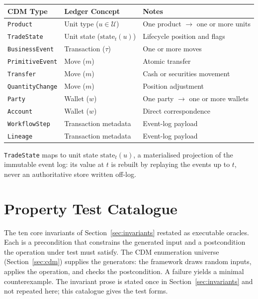 \documentclass[11pt,a4paper]{article}
\begin{document}
\begin{center}
\begin{tabular}{l l l}
\toprule
\textbf{CDM Type} & \textbf{Ledger Concept} & \textbf{Notes} \\
\midrule
\texttt{Product} & Unit type ($u \in \mathcal{U}$) & One product $\to$ one or more units \\
\texttt{TradeState} & Unit state ($\text{state}_t(u)$) & Lifecycle position and flags \\
\texttt{BusinessEvent} & Transaction ($\tau$) & One or more moves \\
\texttt{PrimitiveEvent} & Move ($m$) & Atomic transfer \\
\texttt{Transfer} & Move ($m$) & Cash or securities movement \\
\texttt{QuantityChange} & Move ($m$) & Position adjustment \\
\texttt{Party} & Wallet ($w$) & One party $\to$ one or more wallets \\
\texttt{Account} & Wallet ($w$) & Direct correspondence \\
\texttt{WorkflowStep} & Transaction metadata & Event-log payload \\
\texttt{Lineage} & Transaction metadata & Event-log payload \\
\bottomrule
\end{tabular}
\end{center}

\texttt{TradeState} maps to unit state $\text{state}_t(u)$, a materialised projection of the immutable event log: its value at $t$ is rebuilt by replaying the events up to $t$, never an authoritative store written off-log.

\section{Property Test Catalogue}
\label{app:properties}

The ten core invariants of Section~\ref{sec:invariants} restated as executable oracles. Each is a precondition that constrains the generated input and a postcondition the operation under test must satisfy. The CDM enumeration universe (Section~\ref{sec:cdm}) supplies the generators: the framework draws random inputs, applies the operation, and checks the postcondition. A failure yields a minimal counterexample. The invariant prose is stated once in Section~\ref{sec:invariants} and not repeated here; this catalogue gives the test forms.
\end{document}
